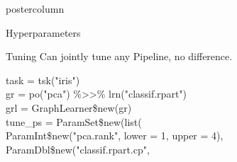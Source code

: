\documentclass{beamer}
\newcommand{\codeinline}[1]{\begin{codeboxinline}#1\end{codeboxinline}}
\begin{document}
\begin{frame}[fragile]{}
\begin{columns}
\begin{column}{.245\textwidth}
\begin{beamercolorbox}[center]{postercolumn}
\begin{minipage}{.98\textwidth}
{\begin{myblock}{Hyperparameters}
            \end{myblock}
              \vspace{-1.0em}
           \begin{myblock}{Tuning}
              \vspace{-1.0em}
             Can jointly tune any Pipeline, no difference.  
             \begin{codeboxexample}
						  {\footnotesize
               task = tsk("iris")\\
               gr = po("pca") \%>{}>\% lrn("classif.rpart")\\
               grl = GraphLearner\$new(gr)\\
               tune\_ps = ParamSet\$new(list(\\
               \hspace*{1ex} ParamInt\$new("pca.rank", lower = 1, upper = 4),\\
               \hspace*{1ex} ParamDbl\$new("classif.rpart.cp",\\
}
\end{codeboxexample}
\end{myblock}}
\end{minipage}
\end{beamercolorbox}
\end{column}
\end{columns}
\end{frame}
\end{document}

